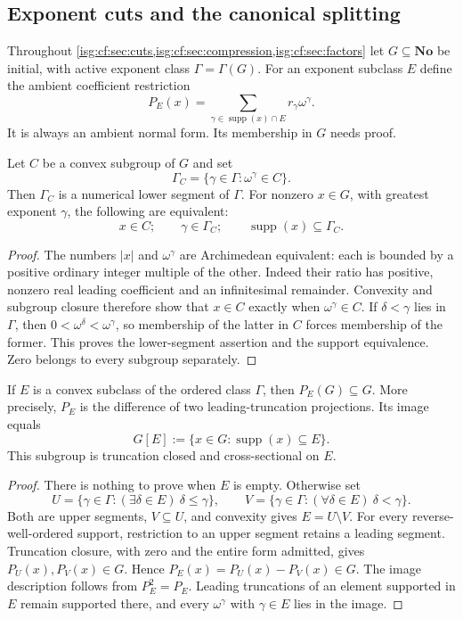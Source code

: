 \documentclass[11pt]{article}
\theoremstyle{definition}
\theoremstyle{remark}
\newcommand{\No}{\ensuremath{\mathbf{No}}}
\newcommand{\supp}{\operatorname{supp}}
\begin{document}
\subsection{Exponent cuts and the canonical splitting}
Throughout \cref{isg:cf:sec:cuts,isg:cf:sec:compression,isg:cf:sec:factors}
let $G\subseteq\No$ be initial, with active exponent class
$\Gamma=\Gamma(G)$. For an exponent subclass $E$ define the ambient
coefficient restriction
\[
 P_E(x)=\sum_{\gamma\in\supp(x)\cap E}r_\gamma\omega^\gamma.
\]
It is always an ambient normal form. Its membership in $G$ needs proof.

\begin{lemma}\label{isg:cf:lem:arch}
Let $C$ be a convex subgroup of $G$ and set
\[
 \Gamma_C=\{\gamma\in\Gamma:\omega^\gamma\in C\}.
\]
Then $\Gamma_C$ is a numerical lower segment of $\Gamma$. For nonzero
$x\in G$, with greatest exponent $\gamma$, the following are equivalent:
\[
 x\in C;\qquad \gamma\in\Gamma_C;\qquad
 \supp(x)\subseteq\Gamma_C.
\]
\end{lemma}
\begin{proof}
The numbers $|x|$ and $\omega^\gamma$ are Archimedean equivalent:
each is bounded by a positive ordinary integer multiple of the other.
Indeed their ratio has positive, nonzero real leading coefficient and
an infinitesimal remainder. Convexity and subgroup closure therefore
show that $x\in C$ exactly when $\omega^\gamma\in C$.
If $\delta<\gamma$ lies in $\Gamma$, then
$0<\omega^\delta<\omega^\gamma$, so membership of the latter in $C$
forces membership of the former. This proves the lower-segment assertion
and the support equivalence. Zero belongs to every subgroup separately.
\end{proof}

\begin{lemma}\label{isg:cf:lem:restriction}
If $E$ is a convex subclass of the ordered class $\Gamma$, then
$P_E(G)\subseteq G$. More precisely, $P_E$ is the difference of two
leading-truncation projections. Its image equals
\[
 G[E]:=\{x\in G:\supp(x)\subseteq E\}.
\]
This subgroup is truncation closed and cross-sectional on $E$.
\end{lemma}
\begin{proof}
There is nothing to prove when $E$ is empty. Otherwise set
\[
 U=\{\gamma\in\Gamma:(\exists\delta\in E)\ \delta\le\gamma\},
 \qquad
 V=\{\gamma\in\Gamma:(\forall\delta\in E)\ \delta<\gamma\}.
\]
Both are upper segments, $V\subseteq U$, and convexity gives $E=U\setminus V$.
For every reverse-well-ordered support, restriction to an upper segment
retains a leading segment. Truncation closure, with zero and the entire
form admitted, gives $P_U(x),P_V(x)\in G$. Hence
$P_E(x)=P_U(x)-P_V(x)\in G$. The image description follows from
$P_E^2=P_E$. Leading truncations of an element supported in $E$ remain
supported there, and every $\omega^\gamma$ with $\gamma\in E$ lies in
the image.
\end{proof}
\end{document}
